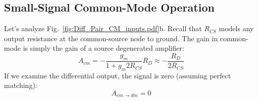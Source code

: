 \subsection{Small-Signal Common-Mode Operation}
Let's analyze Fig.~\ref{fig:Diff_Pair_CM_inputs.pdf}b.  Recall that $R_{CS}$ models any output resistance at the common-source node to ground.   The gain in common-mode is simply the gain of a source degenerated amplifier:
    \begin{equation}
        A_{cm} = -\frac{g_m}{1 + g_m 2R_{CS}} R_D \approx -\frac{R_D}{2R_{CS}}
    \end{equation}
If we examine the differential output, the signal is zero (assuming perfect matching):
    \begin{equation}
        A_{cm \to dm} = 0
    \end{equation}
